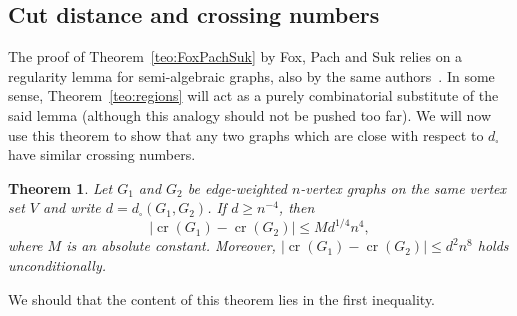 \documentclass{article}
\newcounter{contSect} \numberwithin{contSect}{section}
\newtheorem{theorem}[contSect]{Theorem}
\begin{document}
\subsection{Cut distance and crossing numbers}

The proof of Theorem~\ref{teo:FoxPachSuk} by Fox, Pach and Suk relies on a regularity lemma for semi-algebraic graphs, also by the same authors~\cite{fox2014density}. In some sense, Theorem~\ref{teo:regions} will act as a purely combinatorial substitute of the said lemma (although this analogy should not be pushed too far). We will now use this theorem to show that any two graphs which are close with respect to $d_\square$ have similar crossing numbers.

\begin{theorem}\label{teo:closegraphs}
    Let $G_1$ and $G_2$ be edge-weighted $n$-vertex graphs on the same vertex set $V$ and write $d=d_\square(G_1,G_2)$. If $d\geq n^{-4}$, then \[|\mathop{\mathrm{cr}}(G_1)-\mathop{\mathrm{cr}}(G_2)|\leq Md^{1/4}n^4,\] where $M$ is an absolute constant. Moreover, $|\mathop{\mathrm{cr}}(G_1)-\mathop{\mathrm{cr}}(G_2)|\leq d^2n^8$ holds unconditionally.
\end{theorem}

We should that the content of this theorem lies in the first inequality.
\end{document}
